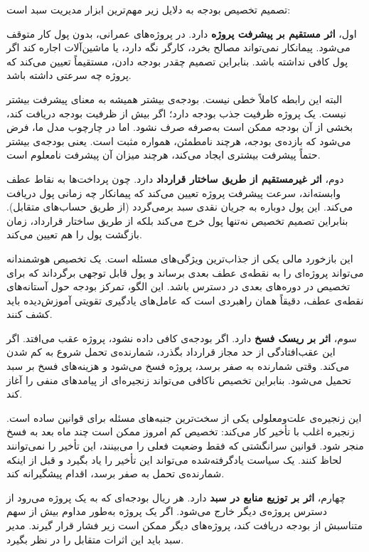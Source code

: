تصمیم تخصیص بودجه به دلایل زیر مهم‌ترین ابزار مدیریت سبد است:

اول، \textbf{اثر مستقیم بر پیشرفت پروژه} دارد. در پروژه‌های
عمرانی، بدون پول کار متوقف می‌شود. پیمانکار نمی‌تواند مصالح بخرد،
کارگر نگه دارد، یا ماشین‌آلات اجاره کند اگر پول کافی نداشته باشد.
بنابراین تصمیم چقدر بودجه دادن، مستقیماً تعیین می‌کند که پروژه
چه سرعتی داشته باشد.

البته این رابطه کاملاً خطی نیست. بودجه‌ی بیشتر همیشه به معنای
پیشرفت بیشتر نیست. یک پروژه ظرفیت جذب بودجه دارد؛ اگر بیش از ظرفیت
بودجه دریافت کند، بخشی از آن بودجه ممکن است به‌صرفه صرف نشود.
اما در چارچوب مدل ما، فرض می‌شود که بازده‌ی بودجه، هرچند نامطمئن،
همواره مثبت است. یعنی بودجه‌ی بیشتر حتماً پیشرفت بیشتری ایجاد
می‌کند، هرچند میزان آن پیشرفت نامعلوم است.

دوم، \textbf{اثر غیرمستقیم از طریق ساختار قرارداد} دارد. چون
پرداخت‌ها به نقاط عطف وابسته‌اند، سرعت پیشرفت پروژه تعیین می‌کند
که پیمانکار چه زمانی پول دریافت می‌کند. این پول دوباره به جریان
نقدی سبد برمی‌گردد (از طریق حساب‌های متقابل). بنابراین تصمیم
تخصیص نه‌تنها پول خرج می‌کند بلکه از طریق ساختار قرارداد، زمان
بازگشت پول را هم تعیین می‌کند.

این بازخورد مالی یکی از جذاب‌ترین ویژگی‌های مسئله است. یک تخصیص
هوشمندانه می‌تواند پروژه‌ای را به نقطه‌ی عطف بعدی برساند و پول
قابل توجهی برگرداند که برای تخصیص در دوره‌های بعدی در دسترس باشد.
این الگو، تمرکز بودجه حول آستانه‌های نقطه‌ی عطف، دقیقاً همان
راهبردی است که عامل‌های یادگیری تقویتی آموزش‌دیده باید کشف کنند.

سوم، \textbf{اثر بر ریسک فسخ} دارد. اگر بودجه‌ی کافی داده نشود،
پروژه عقب می‌افتد. اگر این عقب‌افتادگی از حد مجاز قرارداد بگذرد،
شمارنده‌ی تحمل شروع به کم شدن می‌کند. وقتی شمارنده به صفر برسد،
پروژه فسخ می‌شود و هزینه‌های فسخ بر سبد تحمیل می‌شود. بنابراین
تخصیص ناکافی می‌تواند زنجیره‌ای از پیامدهای منفی را آغاز کند.

این زنجیره‌ی علت‌و‌معلولی یکی از سخت‌ترین جنبه‌های مسئله برای
قوانین ساده است. زنجیره اغلب با تأخیر کار می‌کند: تخصیص کم امروز
ممکن است چند ماه بعد به فسخ منجر شود. قوانین سرانگشتی که فقط وضعیت
فعلی را می‌بینند، این تأخیر را نمی‌توانند لحاظ کنند. یک سیاست
یادگرفته‌شده می‌تواند این تأخیر را یاد بگیرد و قبل از اینکه
شمارنده‌ی تحمل به صفر برسد، اقدام پیشگیرانه کند.

چهارم، \textbf{اثر بر توزیع منابع در سبد} دارد. هر ریال بودجه‌ای
که به یک پروژه می‌رود از دسترس پروژه‌ی دیگر خارج می‌شود. اگر یک
پروژه به‌طور مداوم بیش از سهم متناسبش از بودجه دریافت کند، پروژه‌های
دیگر ممکن است زیر فشار قرار گیرند. مدیر سبد باید این اثرات متقابل
را در نظر بگیرد.

